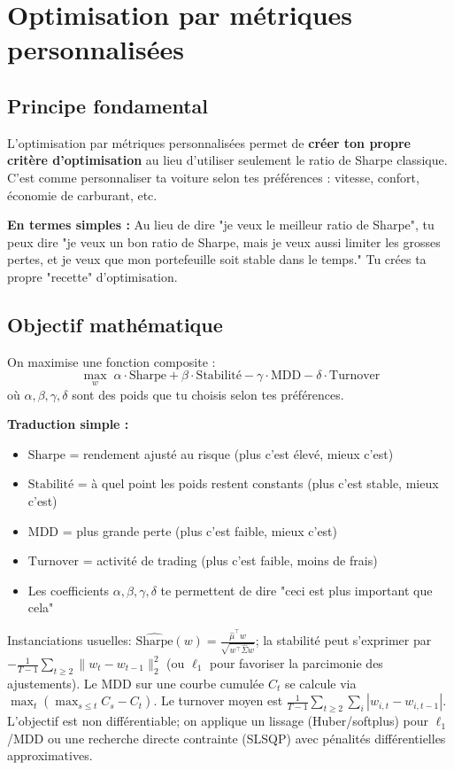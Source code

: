 \documentclass[11pt,a4paper]{article}
\begin{document}
\FloatBarrier
\section{Optimisation par métriques personnalisées}

\subsection{Principe fondamental}
L'optimisation par métriques personnalisées permet de \textbf{créer ton propre critère d'optimisation} au lieu d'utiliser seulement le ratio de Sharpe classique. C'est comme personnaliser ta voiture selon tes préférences : vitesse, confort, économie de carburant, etc.

\textbf{En termes simples :} Au lieu de dire "je veux le meilleur ratio de Sharpe", tu peux dire "je veux un bon ratio de Sharpe, mais je veux aussi limiter les grosses pertes, et je veux que mon portefeuille soit stable dans le temps." Tu crées ta propre "recette" d'optimisation.

\subsection{Objectif mathématique}
On maximise une fonction composite :
\[\max_w \; \alpha \cdot \text{Sharpe} + \beta \cdot \text{Stabilité} - \gamma \cdot \text{MDD} - \delta \cdot \text{Turnover}\]
où \(\alpha, \beta, \gamma, \delta\) sont des poids que tu choisis selon tes préférences.

\textbf{Traduction simple :} 
\begin{itemize}
\item \(\text{Sharpe}\) = rendement ajusté au risque (plus c'est élevé, mieux c'est)
\item \(\text{Stabilité}\) = à quel point les poids restent constants (plus c'est stable, mieux c'est)
\item \(\text{MDD}\) = plus grande perte (plus c'est faible, mieux c'est)
\item \(\text{Turnover}\) = activité de trading (plus c'est faible, moins de frais)
\item Les coefficients \(\alpha, \beta, \gamma, \delta\) te permettent de dire "ceci est plus important que cela"
\end{itemize}
\noindent Instanciations usuelles: \(\widehat{\text{Sharpe}}(w)=\frac{\hat\mu^\top w}{\sqrt{w^\top \hat\Sigma w}}\); la stabilité peut s'exprimer par \(-\frac{1}{T-1}\sum_{t\ge 2}\lVert w_t-w_{t-1}\rVert_2^2\) (ou \(\ell_1\) pour favoriser la parcimonie des ajustements). Le \(\text{MDD}\) sur une courbe cumulée \(C_t\) se calcule via \(\max_t (\max_{s\le t} C_s - C_t)\). Le turnover moyen est \(\frac{1}{T-1}\sum_{t\ge 2}\sum_i |w_{i,t}-w_{i,t-1}|\). L'objectif est non différentiable; on applique un lissage (Huber/softplus) pour \(\ell_1\)/MDD ou une recherche directe contrainte (SLSQP) avec pénalités différentielles approximatives.
\end{document}
